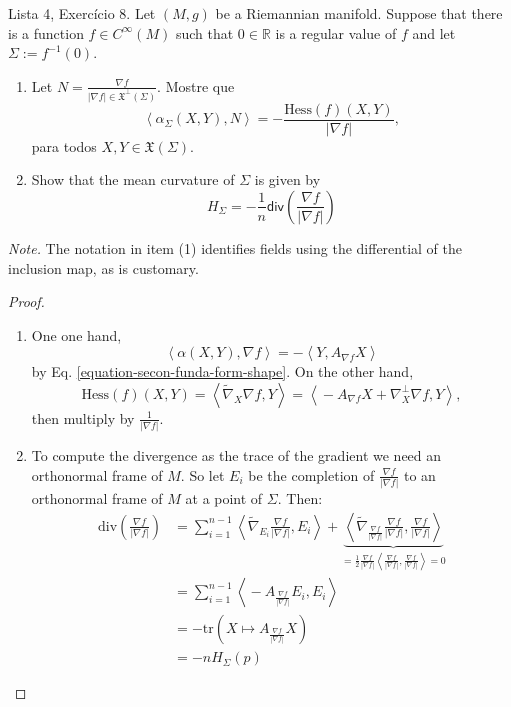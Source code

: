 \documentclass{book}
\begin{document}
\begin{exercise}
\label{exercise-mean-curvature}
Lista 4, Exercício 8. Let $(M,g)$ be a
Riemannian manifold. Suppose that there
is a function $f \in C^\infty(M)$ such that
$0 \in \mathbb{R}$ is a regular
value of $f$ and let $\Sigma:=f^{-1}(0)$.
\begin{enumerate}
\item Let $N=\frac{\nabla f}{|\nabla f| \in
\mathfrak{X}^\perp(\Sigma)}$. Mostre
que
$$
\left\langle{}\alpha_{\Sigma}(X,Y),N\right\rangle{}=-
\frac{\text{Hess}(f)(X,Y)}{|\nabla
f|},
$$
para todos $X,Y \in \mathfrak{X}(\Sigma)$.

\item Show that the mean curvature of
$\Sigma$ is given by
$$
H_{\Sigma}=-\frac{1}{n}\mathsf{div}
\left(\frac{\nabla
f}{|\nabla f|}\right)
$$
\end{enumerate}
{\it Note.} The notation in item (1)
identifies fields using the differential of
the inclusion map, as is customary.
\end{exercise}

\begin{proof}
\begin{enumerate}
\item One one hand,
 $$
\left\langle{}\alpha(X,Y),\nabla
f\right\rangle{}=-\left\langle{}Y,A_{\nabla f}X\right\rangle{}
$$
by Eq. \ref{equation-secon-funda-form-shape}.
On the other hand,
$$
\text{Hess}(f)(X,Y)=\left\langle{}\tilde{\nabla}_X
\nabla f,Y\right\rangle{}=
\left\langle{}-A_{\nabla f}X+\nabla_X^\perp \nabla
f,Y\right\rangle{},
$$
then multiply by $\frac{1}{|\nabla f|}$.

\item To compute the divergence as the trace
of the gradient we need an
orthonormal frame of $M$. So let $E_i$ be the
completion of
$\frac{\nabla f}{|\nabla f|}$ to an
orthonormal frame of $M$ at a point of
$\Sigma$. Then:
\begin{equation}
\label{equation-diver-norma-gradi}
\begin{aligned}
\text{div}\left(\frac{\nabla f}{|\nabla
f|}\right)
&=\sum_{i=1}^{n-1}
\left\langle{}\tilde{\nabla}_{E_i}\frac{\nabla
f}{|\nabla f|},E_i\right\rangle{}
+\underbrace{\left\langle{}\tilde{\nabla}
_{\frac{\nabla
f}{|\nabla f|}}
\frac{\nabla f}{|\nabla f|},\frac{\nabla
f}{|\nabla f|}\right\rangle{}}
_{=\frac{1}{2}\frac{\nabla f}{|\nabla f|}
\left\langle{}\frac{\nabla f}{|\nabla
f|},\frac{\nabla f}{|\nabla f|}\right\rangle{}=0}
\\
&=\sum_{i=1}^{n-1} \left\langle{}-A_{\frac{\nabla
f}{|\nabla f|}}E_i,E_i\right\rangle{}\\
&=-\text{tr}\left(X \mapsto A_{\frac{\nabla
f}{|\nabla f|}}X\right)\\
&=-nH_{\Sigma}(p)
\end{aligned}
\end{equation}
\end{enumerate}
\end{proof}
\end{document}

